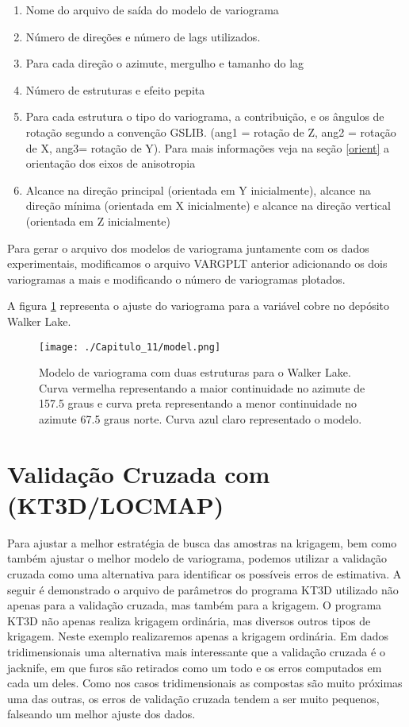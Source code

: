 \begin{enumerate}
	\item Nome do arquivo de saída do modelo de variograma 
	\item Número de direções e número de lags utilizados.
	\item Para cada direção o azimute, mergulho e tamanho do lag 
	\item Número de estruturas e efeito pepita 
	\item Para cada estrutura o tipo do variograma, a contribuição, e os ângulos de rotação segundo a convenção GSLIB. (ang1 = rotação de Z, ang2 = rotação de X, ang3= rotação de Y). Para mais informações veja na seção \ref{orient} a orientação dos eixos de anisotropia
	\item Alcance na direção principal (orientada em Y inicialmente), alcance na direção mínima (orientada em X inicialmente) e alcance na direção vertical (orientada em Z inicialmente)
\end{enumerate}

Para gerar o arquivo dos modelos de variograma juntamente com os dados experimentais, modificamos o arquivo VARGPLT anterior adicionando os dois variogramas a mais e modificando o número de variogramas plotados.

\begin{small}
	\begingroup
	
	\endgroup
\end{small}

A figura \ref{modelo_var} representa o ajuste do variograma para a variável cobre no depósito Walker Lake.

\FloatBarrier
\begin{figure}[h]
	\centering
	\texttt{[image: ./Capitulo\_11/model.png]}	
	\caption{ Modelo de variograma com duas estruturas para o Walker Lake. Curva vermelha representando a maior continuidade no azimute de 157.5 graus e curva preta representando a menor continuidade no azimute 67.5 graus norte. Curva azul claro representado o modelo.}
	\label{modelo_var}
\end{figure}
\FloatBarrier

\section{Validação Cruzada com (KT3D/LOCMAP)}

Para ajustar a melhor estratégia de busca das amostras na krigagem, bem como também ajustar o melhor modelo de variograma, podemos utilizar a validação cruzada como uma alternativa para identificar os possíveis erros de estimativa. A seguir é demonstrado o arquivo de parâmetros do programa KT3D utilizado não apenas para a validação cruzada, mas também para a krigagem. O programa KT3D não apenas realiza krigagem ordinária, mas diversos outros tipos de krigagem. Neste exemplo realizaremos apenas a krigagem ordinária. Em dados tridimensionais uma alternativa mais interessante que a validação cruzada é o jacknife, em que furos são retirados como um todo e os erros computados em cada um deles. Como nos casos tridimensionais as compostas são muito próximas uma das outras, os erros de validação cruzada tendem a ser muito pequenos, falseando um melhor ajuste dos dados. 


